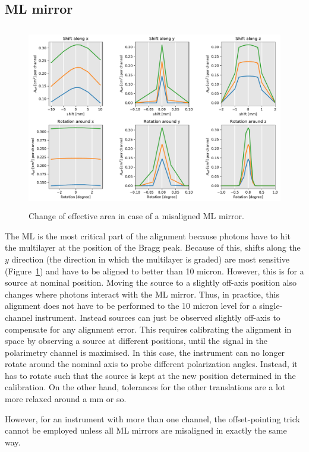 \documentclass[]{spie}  %
\begin{document}
\subsection{ML mirror}
\begin{figure} [ht]
  \begin{center}
    \includegraphics[height=8cm]{LGML_global.pdf}
  \end{center}
  \caption
      { \label{fig:LGML_global}Change of effective area in case of a misaligned ML mirror. 
}
\end{figure}

The ML is the most critical part of the alignment because photons have
to hit the multilayer at the position of the Bragg peak. Because of
this, shifts along the $y$ direction (the direction in which the
multilayer is graded) are most sensitive
(Figure~\ref{fig:LGML_global}) and have to be aligned to better than
10 micron. However, this is for a source at nominal position. Moving
the source to a slightly off-axis position also changes where photons
interact with the ML mirror. Thus, in practice, this alignment does
not have to be performed to the 10 micron level for a single-channel
instrument. Instead sources can just be observed slightly off-axis to
compensate for any alignment error. This requires calibrating the
alignment in space by observing a source at different positions, until
the signal in the polarimetry channel is maximised. In this case, the
instrument can no longer rotate around the nominal axis to probe
different polarization angles. Instead, it has to rotate such that the
source is kept at the new position determined in the calibration. On
the other hand, tolerances for the other translations are a lot more
relaxed around a mm or so.

However, for an instrument with more than one channel, the
offset-pointing trick cannot be employed unless all ML mirrors are
misaligned in exactly the same way.
\end{document}
